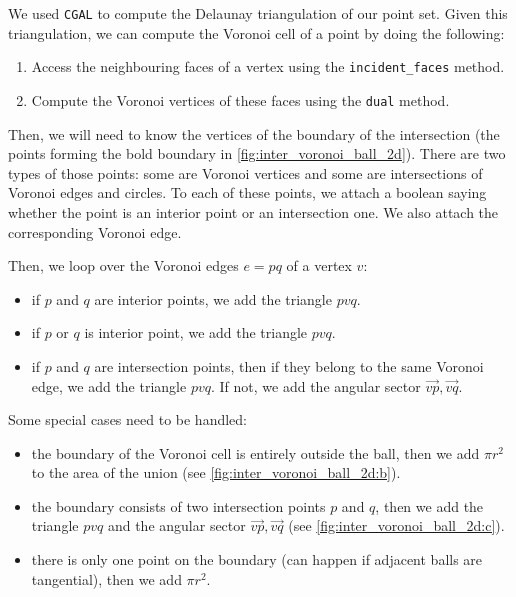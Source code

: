 We used \texttt{CGAL} to compute the Delaunay triangulation of our point set.
Given this triangulation, we can compute the Voronoi cell of a point by doing
the following:
\begin{enumerate}
    \item Access the neighbouring faces of a vertex using the
        \texttt{incident\_faces} method.
    \item Compute the Voronoi vertices of these faces using the \texttt{dual}
        method.
\end{enumerate}

Then, we will need to know the vertices of the boundary of the intersection (the
points forming the bold boundary in \ref{fig:inter_voronoi_ball_2d}). There are
two types of those points: some are Voronoi vertices and some are intersections
of Voronoi edges and circles. To each of these points, we attach a boolean
saying whether the point is an interior point or an intersection one. We also
attach the corresponding Voronoi edge.

Then, we loop over the Voronoi edges $ e = pq $ of a vertex $ v $:
\begin{itemize}
    \item if $ p $ and $ q $ are interior points, we add the triangle $ pvq $.
    \item if $ p $ or $ q $ is interior point, we add the triangle $ pvq $.
    \item if $ p $ and $ q $ are intersection points, then if they belong to the
        same Voronoi edge, we add the triangle $ pvq $. If not, we add the
        angular sector $ \vec{vp}, \vec{vq} $.
\end{itemize}

Some special cases need to be handled:
\begin{itemize}
    \item the boundary of the Voronoi cell is entirely outside the ball, then we
        add $ \pi r^2 $ to the area of the union (see
        \ref{fig:inter_voronoi_ball_2d:b}).
    \item the boundary consists of two intersection points $ p $ and $ q $, then
        we add the triangle $ pvq $ and the angular sector $ \vec{vp}, \vec{vq}
        $ (see \ref{fig:inter_voronoi_ball_2d:c}).
    \item there is only one point on the boundary (can happen if adjacent balls
        are tangential), then we add $ \pi r^2 $.
\end{itemize}

